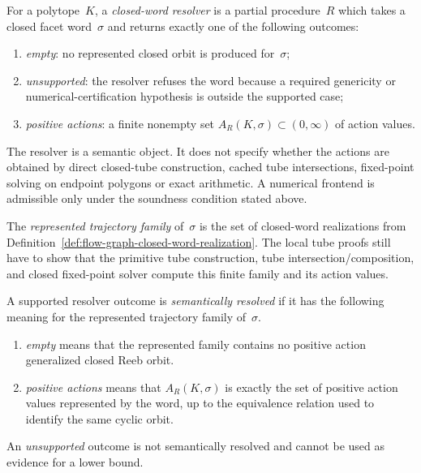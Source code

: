 \begin{unverified}
\begin{definition}\label{def:flow-graph-closed-word-resolver}
For a polytope~$K$, a \emph{closed-word resolver} is a partial procedure~$R$
which takes a closed facet word~$\sigma$ and returns exactly one of the
following outcomes:
\begin{enumerate}
  \item \emph{empty}: no represented closed orbit is produced for~$\sigma$;
  \item \emph{unsupported}: the resolver refuses the word because a required
    genericity or numerical-certification hypothesis is outside the supported
    case;
  \item \emph{positive actions}: a finite nonempty set
    $A_R(K,\sigma) \subset (0,\infty)$ of action values.
\end{enumerate}
The resolver is a semantic object.  It does not specify whether the actions
are obtained by direct closed-tube construction, cached tube intersections,
    fixed-point solving on endpoint polygons or exact arithmetic. A numerical
    frontend is admissible only under the soundness condition stated above.

The \emph{represented trajectory family} of~$\sigma$ is the set of
closed-word realizations from
Definition~\ref{def:flow-graph-closed-word-realization}.  The local tube
proofs still have to show that the primitive tube construction, tube
intersection/composition, and closed fixed-point solver compute this finite
family and its action values.

A supported resolver outcome is \emph{semantically resolved} if it has the
following meaning for the represented trajectory family of~$\sigma$.
\begin{enumerate}
  \item \emph{empty} means that the represented family contains no positive
    action generalized closed Reeb orbit.
  \item \emph{positive actions} means that $A_R(K,\sigma)$ is exactly the set of
    positive action values represented by the word, up to the equivalence
    relation used to identify the same cyclic orbit.
\end{enumerate}
An \emph{unsupported} outcome is not semantically resolved and cannot be used
as evidence for a lower bound.
\end{definition}
\end{unverified}

